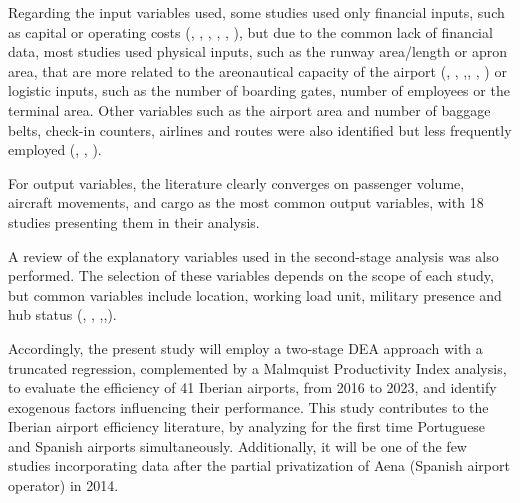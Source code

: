 Regarding the input variables used, some studies used only financial inputs, such as capital or operating costs (\cite{martin2001}, \cite{barros2008}, \cite{barrosdieke2008}, \cite{coto-millan2014}, \cite{coto-millan2016}, \cite{inglada2018}), but due to the common lack of financial data, most studies used physical inputs, such as the runway area/length or apron area, that are more related to the areonautical capacity of the airport (\cite{lin2006}, \cite{barros2008b}, \cite{tsekeris2011},\cite{lozano2013}, \cite{fragoudaki2016}, \cite{gutierrez2016}) or logistic inputs, such as the number of boarding gates, number of employees or the terminal area.
Other variables such as the airport area and number of baggage belts, check-in counters, airlines and routes were also identified but less frequently employed (\cite{lozano2013}, \cite{gutierrez2016}, \cite{cifuentes-faura2023}). 

For output variables, the literature clearly converges
on passenger volume, aircraft movements, and cargo as the most common output variables, with 18 studies presenting them in their analysis.

A review of the explanatory variables used in the second-stage analysis was also performed. The selection of these variables depends on the scope of each study, but common variables include location, working load unit, military presence and hub status (\cite{barrosdieke2008}, \cite{barros2008b}, \cite{tsekeris2011},\cite{adler2013},\cite{fragoudaki2016}). 

Accordingly, the present study will employ a two-stage DEA approach with a truncated regression, complemented by a Malmquist Productivity Index analysis, to evaluate the efficiency of 41 Iberian airports, from 2016 to 2023, and identify exogenous factors influencing their performance. 
This study contributes to the Iberian airport efficiency literature, by analyzing for the first time Portuguese and Spanish airports simultaneously. Additionally, it will be one of the few studies incorporating data after the partial privatization of Aena (Spanish airport operator) in 2014. 